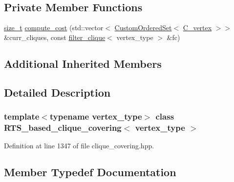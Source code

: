 \subsection*{Private Member Functions}
\begin{DoxyCompactItemize}
\item 
\hyperlink{tutorial__fpt__2017_2intro_2sixth_2test_8c_a7c94ea6f8948649f8d181ae55911eeaf}{size\+\_\+t} \hyperlink{classRTS__based__clique__covering_aa3332cac0f1be5a924e163ed8bc601c3}{compute\+\_\+cost} (std\+::vector$<$ \hyperlink{classCustomOrderedSet}{Custom\+Ordered\+Set}$<$ \hyperlink{clique__covering__graph_8hpp_a9cb45047ea8c5ed95a8cfa90494345aa}{C\+\_\+vertex} $>$$>$ \&curr\+\_\+cliques, const \hyperlink{structfilter__clique}{filter\+\_\+clique}$<$ vertex\+\_\+type $>$ \&fc)
\end{DoxyCompactItemize}
\subsection*{Additional Inherited Members}


\subsection{Detailed Description}
\subsubsection*{template$<$typename vertex\+\_\+type$>$\newline
class R\+T\+S\+\_\+based\+\_\+clique\+\_\+covering$<$ vertex\+\_\+type $>$}



Definition at line 1347 of file clique\+\_\+covering.\+hpp.



\subsection{Member Typedef Documentation}
\mbox{\label{classRTS__based__clique__covering_ac697cd880202357fe31962b3b45bcb4c}} 
